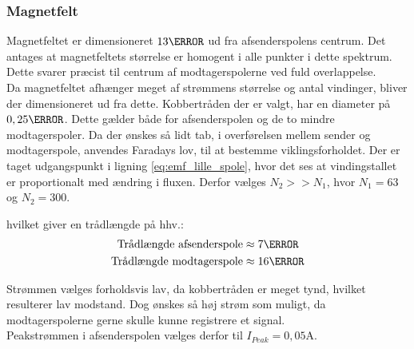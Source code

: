 \subsubsection{Magnetfelt}
Magnetfeltet er dimensioneret $13\mm$ ud fra afsenderspolens centrum.
Det antages at magnetfeltets størrelse er homogent i alle punkter i dette spektrum.
Dette svarer præcist til centrum af modtagerspolerne ved fuld overlappelse.\\
Da magnetfeltet afhænger meget af strømmens størrelse og antal vindinger, bliver der dimensioneret ud fra dette.
Kobbertråden der er valgt, har en diameter på $0,25\mm$.
Dette gælder både for afsenderspolen og de to mindre modtagerspoler.
Da der ønskes så lidt tab, i overførelsen mellem sender og modtagerspole, anvendes Faradays lov, til at bestemme viklingsforholdet.
Der er taget udgangspunkt i ligning \ref{eq:emf_lille_spole}, hvor det ses at vindingstallet er proportionalt med ændring i fluxen.
Derfor vælges $N_2>>N_1$, hvor $N_1 = 63$ og $N_2 = 300$.

hvilket giver en trådlængde på hhv.:
\begin{align}
	\text{Trådlængde afsenderspole} & \approx 7\m  \nonumber \\
	\text{Trådlængde modtagerspole} & \approx 16\m \nonumber
\end{align}

Strømmen vælges forholdsvis lav, da kobbertråden er meget tynd, hvilket resulterer lav modstand. 
Dog ønskes så høj strøm som muligt, da modtagerspolerne gerne skulle kunne registrere et signal.\\
Peakstrømmen i afsenderspolen vælges derfor til $I_{Peak} = 0,05\si{\ampere}$.

